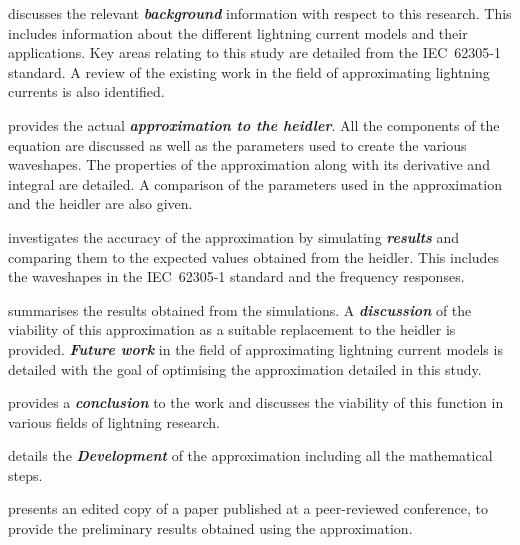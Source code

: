  discusses the relevant \textbf{\textit{background}} information with respect to this research. This includes information about the different lightning current models and their applications. Key areas relating to this study are detailed from the IEC~62305-1 standard. A review of the existing work in the field of approximating lightning currents is also identified.

 provides the actual \textbf{\textit{approximation to the \gls{heidler}}}. All the components of the equation are discussed as well as the parameters used to create the various waveshapes. The properties of the approximation along with its derivative and integral are detailed. A comparison of the parameters used in the approximation and the \gls{heidler} are also given.

 investigates the accuracy of the approximation by simulating \textbf{\textit{results}} and comparing them to the expected values obtained from the \gls{heidler}. This includes the waveshapes in the IEC~62305-1 standard and the frequency responses.

 summarises the results obtained from the simulations. A \textbf{\textit{discussion}} of the viability of this approximation as a suitable replacement to the \gls{heidler} is provided. \textbf{\textit{Future work}} in the field of approximating lightning current models is detailed with the goal of optimising the approximation detailed in this study.

 provides a \textbf{\textit{conclusion}} to the work and discusses the viability of this function in various fields of lightning research.

 details the \textbf{\textit{Development}} of the approximation including all the mathematical steps.

 presents an edited copy of a paper published at a peer-reviewed conference, to provide the preliminary results obtained using the approximation.
